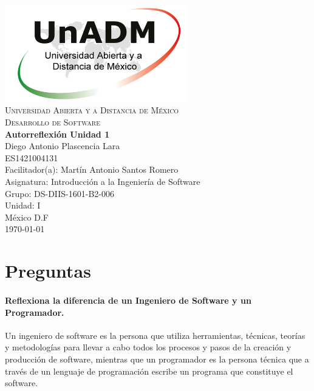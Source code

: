 \documentclass[spanish,12pt,letterpapper]{article}
\begin{document}
	\begin{titlepage}
		\begin{center}
			\includegraphics[width=0.6\textwidth]{../logoUnADM}~\\[1cm] 
			\textsc{Universidad Abierta y a Distancia de México}\\[0.8cm]
			\textsc{Desarrollo de Software}\\[1.8cm]
			
			\textbf{ \Large Autorreflexión Unidad 1}\\[3cm]
			
			Diego Antonio Plascencia Lara\\ ES1421004131 \\[0.4cm]
			Facilitador(a): Martín Antonio Santos Romero\\
			Asignatura: Introducción a la Ingeniería de Software\\
			Grupo: DS-DIIS-1601-B2-006 \\
			Unidad: I \\
			
			\vfill México D.F\\{\today}
			
		\end{center}
	\end{titlepage}
	
	\section{Preguntas}
	\paragraph{ Reflexiona la diferencia de un Ingeniero de Software y un Programador.\\}
	Un ingeniero de software es la persona que utiliza herramientas, técnicas, teorías y metodologías para llevar a cabo todos los procesos y pasos de la creación y producción de software, mientras que un programador es la persona técnica que a través de un lenguaje de programación escribe un programa que constituye el software.\\
	
\end{document}
